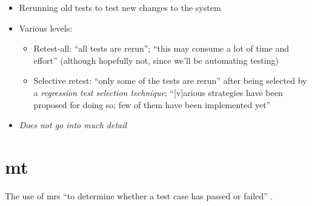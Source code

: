 \begin{itemize}
      \item Rerunning old tests to test new changes to the system
      \item Various levels:
            \begin{itemize}
                  \item Retest-all: ``all tests are rerun''; ``this may consume
                        a lot of time and effort''
                        \cite[p.~411]{van_vliet_software_2000} (although
                        hopefully not, since we'll be automating testing)
                  \item Selective retest: ``only some of the tests are rerun''
                        after being selected by a \emph{regression test
                              selection technique}; ``[v]arious strategies have
                        been proposed for doing so; few of them have been
                        implemented yet'' \cite[p.~411]{van_vliet_software_2000}
            \end{itemize}
      \item \emph{Does not go into much detail} 
\end{itemize}

\section{\acf{mt}}
\label{chap:notes:sec:metamorphic-testing}
The use of \acfp{mr} ``to determine whether a test case has passed or failed''
\cite[p.~67]{kanewala_metamorphic_2019}.
